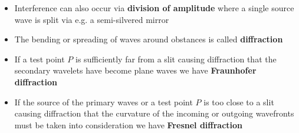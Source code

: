\documentclass{article}
\begin{document}
\begin{itemize}
  \item Interference can also occur via \textbf{division of amplitude} where a single source wave is split via e.g. a semi-silvered mirror

  \item The bending or spreading of waves around obstances is called \textbf{diffraction}

  \item If a test point $P$ is sufficiently far from a slit causing diffraction that the secondary wavelets have become plane waves we have \textbf{Fraunhofer diffraction}

  \item If the source of the primary waves or a test point $P$ is too close to a slit causing diffraction that the curvature of the incoming or outgoing wavefronts must be taken into consideration we have \textbf{Fresnel diffraction}
\end{itemize}
\end{document}
